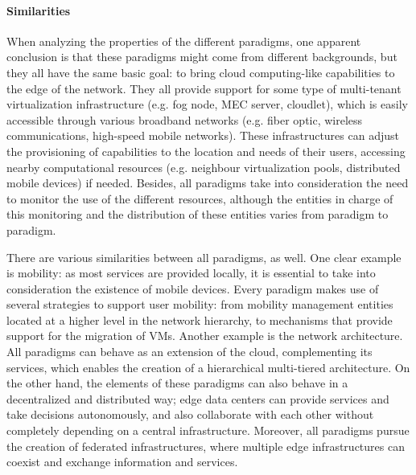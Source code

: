 \documentclass[twocolumn,preprint,3p]{elsarticle}
\begin{document}
\paragraph{Similarities} When analyzing the properties of the different paradigms, one apparent conclusion is that these paradigms might come from different backgrounds, but they all have the same basic goal: to bring cloud computing-like capabilities to the edge of the network. They all provide support for some type of multi-tenant virtualization infrastructure (e.g. fog node, MEC server, cloudlet), which is easily accessible through various broadband networks (e.g. fiber optic, wireless communications, high-speed mobile networks). These infrastructures can adjust the provisioning of capabilities to the location and needs of their users, accessing nearby computational resources (e.g. neighbour virtualization pools, distributed mobile devices) if needed. Besides, all paradigms take into consideration the need to monitor the use of the different resources, although the entities in charge of this monitoring and the distribution of these entities varies from paradigm to paradigm.

There are various similarities between all paradigms, as well. One clear example is mobility: as most services are provided locally, it is essential to take into consideration the existence of mobile devices. Every paradigm makes use of several strategies to support user mobility: from mobility management entities located at a higher level in the network hierarchy, to mechanisms that provide support for the migration of VMs. Another example is the network architecture. All paradigms can behave as an extension of the cloud, complementing its services, which enables the creation of a hierarchical multi-tiered architecture. On the other hand, the elements of these paradigms can also behave in a decentralized and distributed way; edge data centers can provide services and take decisions autonomously, and also collaborate with each other without completely depending on a central infrastructure. Moreover, all paradigms pursue the creation of federated infrastructures, where multiple edge infrastructures can coexist and exchange information and services.
\end{document}
